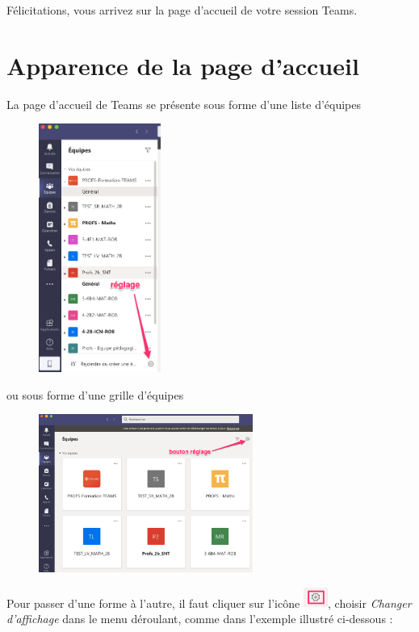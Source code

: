 Félicitations, vous arrivez sur la page d'accueil de votre session Teams.



\section{Apparence de la page d'accueil}

La page d'accueil de Teams se présente sous forme d'une liste d'équipes

\begin{figure}[h]
\includegraphics[width=4cm]{./images/teams/accueil_liste}
\centering
\end{figure}

ou sous forme d'une grille d'équipes 

\begin{figure}[H]
\includegraphics[width=7cm]{./images/teams/accueil_grille}
\centering
\end{figure}

Pour passer d'une forme à l'autre, il faut cliquer sur l'icône \includegraphics[width=0.8cm]{./images/teams/bouton_parametres}, choisir \textit{Changer d'affichage} dans le menu déroulant, comme dans l'exemple illustré ci-dessous :

